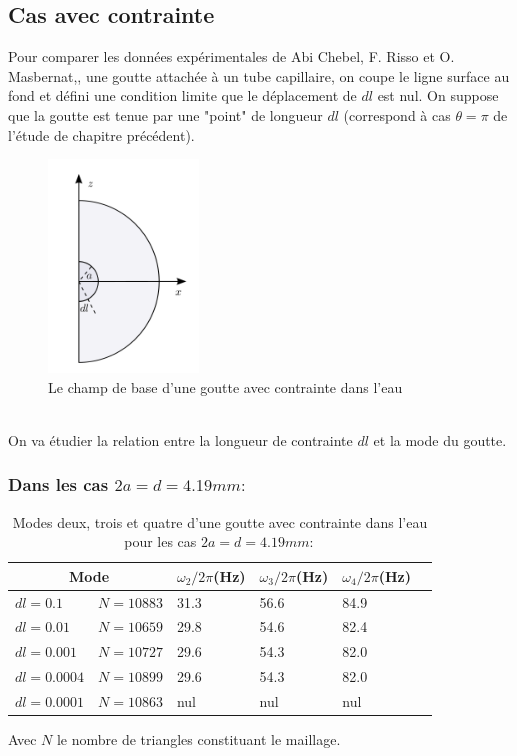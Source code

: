 \documentclass[a4paper]{report}
\begin{document}
\subsection{Cas avec contrainte}
Pour comparer les données expérimentales de Abi Chebel, F. Risso et O. Masbernat,, une goutte attachée à un tube capillaire, on coupe le ligne surface au fond et défini une condition limite que le déplacement de $dl$ est nul. On suppose que la goutte est tenue par une "point" de longueur $dl$ (correspond à cas $\theta = \pi$ de l'étude de chapitre précédent).
\begin{figure}[!htbp]
\centering
\includegraphics[width=4cm]{3_3_2_mesh}
\caption{Le champ de base d'une goutte avec contrainte dans l'eau}
\end{figure}
\\[0.25cm]
On va étudier la relation entre la longueur de contrainte $dl$ et la mode du goutte.
\subsubsection{Dans les cas $2a = d = 4.19 mm :$}


\begin{table}[htp]
\begin{center}
    \begin{tabular}{ | l | l | l | l | l | l | }
    \hline
    \multicolumn{2}{|c|}{Mode}  & $\omega_2/2\pi$(Hz) & $\omega_3/2\pi$(Hz) & $\omega_4/2\pi$(Hz) \\
    \hline
    $dl = 0.1$    & $N = 10883$ & 31.3                & 56.6                & 84.9 \\
    \hline
    $dl = 0.01$   & $N = 10659$ & 29.8                & 54.6                & 82.4 \\
    \hline
    $dl = 0.001$  & $N = 10727$ & 29.6                & 54.3                & 82.0 \\
    \hline
    $dl = 0.0004$ & $N = 10899$ & 29.6                & 54.3                & 82.0 \\
    \hline
    $dl = 0.0001$ & $N = 10863$ & nul                 & nul                 & nul \\
    \hline
    \end{tabular}
\end{center}
\caption{Modes deux, trois et quatre d'une goutte avec contrainte dans l'eau pour les cas $2a = d = 4.19 mm :$}
\end{table}
Avec $N$ le nombre de triangles constituant le maillage.
\newpage
\end{document}
